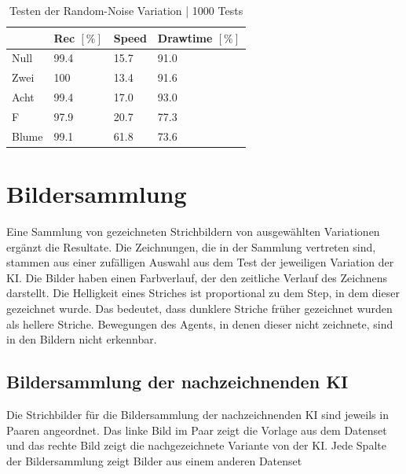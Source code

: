 \begin{table}[!ht]
    \centering
    \caption{Testen der Random-Noise Variation | 1000 Tests}\label{tab:gen-noisy}
    \begin{tabular}{|l|l|l|l|}
    \hline
        ~ & Rec $[\%]$ & Speed & Drawtime $[\%]$ \\ \hline
        Null & 99.4 & 15.7 & 91.0 \\ \hline
        Zwei & 100 & 13.4 & 91.6 \\ \hline
        Acht & 99.4 & 17.0 & 93.0 \\ \hline
        F & 97.9 & 20.7 & 77.3 \\ \hline
        Blume & 99.1 & 61.8 & 73.6 \\ \hline
    \end{tabular}
\end{table}




\section{Bildersammlung}\label{chap:r_bild} Eine Sammlung von gezeichneten
Strichbildern von ausgewählten Variationen ergänzt die Resultate. Die Zeichnungen, die in der Sammlung
vertreten sind, stammen aus einer zufälligen Auswahl aus dem Test der jeweiligen
Variation der KI. Die Bilder haben einen Farbverlauf, der den zeitliche Verlauf
des Zeichnens darstellt. Die Helligkeit eines Striches ist proportional zu dem
Step, in dem dieser gezeichnet wurde. Das bedeutet, dass dunklere Striche früher
gezeichnet wurden als hellere Striche. Bewegungen des Agents, in denen dieser
nicht zeichnete, sind in den Bildern nicht erkennbar.


\subsection{Bildersammlung der nachzeichnenden KI}\label{sub:r_bild_nach}

Die Strichbilder für die Bildersammlung der nachzeichnenden KI sind jeweils in Paaren
angeordnet. Das linke Bild im Paar zeigt die Vorlage aus dem Datenset und das
rechte Bild zeigt die nachgezeichnete Variante von der KI. Jede Spalte der
Bildersammlung zeigt Bilder aus einem anderen Datenset

\newpage

